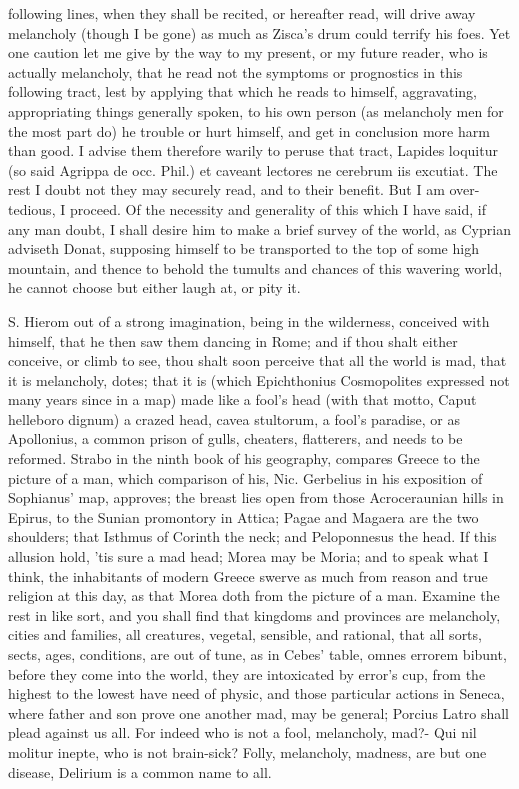 {following lines, when they shall be recited, or hereafter read, will
drive away melancholy (though I be gone) as much as Zisca's drum could
terrify his foes. Yet one caution let me give by the way to my present,
or my future reader, who is actually melancholy, that he read not the
symptoms or prognostics in this following tract, lest by applying
that which he reads to himself, aggravating, appropriating things
generally spoken, to his own person (as melancholy men for the most
part do) he trouble or hurt himself, and get in conclusion more harm
than good. I advise them therefore warily to peruse that tract, Lapides
loquitur (so said Agrippa de occ. Phil.) et caveant lectores ne
cerebrum iis excutiat. The rest I doubt not they may securely read, and
to their benefit. But I am over-tedious, I proceed.
Of the necessity and generality of this which I have said, if any man
doubt, I shall desire him to make a brief survey of the world, as 
Cyprian adviseth Donat, supposing himself to be transported to the top
of some high mountain, and thence to behold the tumults and chances of
this wavering world, he cannot choose but either laugh at, or pity it.

S. Hierom out of a strong imagination, being in the wilderness,
conceived with himself, that he then saw them dancing in Rome; and if
thou shalt either conceive, or climb to see, thou shalt soon perceive
that all the world is mad, that it is melancholy, dotes; that it is
(which Epichthonius Cosmopolites expressed not many years since in a
map) made like a fool's head (with that motto, Caput helleboro dignum)
a crazed head, cavea stultorum, a fool's paradise, or as Apollonius, a
common prison of gulls, cheaters, flatterers, \etc and needs to be
reformed. Strabo in the ninth book of his geography, compares Greece to
the picture of a man, which comparison of his, Nic. Gerbelius in his
exposition of Sophianus' map, approves; the breast lies open from those
Acroceraunian hills in Epirus, to the Sunian promontory in Attica;
Pagae and Magaera are the two shoulders; that Isthmus of Corinth the
neck; and Peloponnesus the head. If this allusion hold, 'tis sure a mad
head; Morea may be Moria; and to speak what I think, the inhabitants of
modern Greece swerve as much from reason and true religion at this day,
as that Morea doth from the picture of a man. Examine the rest in like
sort, and you shall find that kingdoms and provinces are melancholy,
cities and families, all creatures, vegetal, sensible, and rational,
that all sorts, sects, ages, conditions, are out of tune, as in Cebes'
table, omnes errorem bibunt, before they come into the world, they are
intoxicated by error's cup, from the highest to the lowest have need of
physic, and those particular actions in Seneca, where father and
son prove one another mad, may be general; Porcius Latro shall plead
against us all. For indeed who is not a fool, melancholy, mad?-
Qui nil molitur inepte, who is not brain-sick? Folly, melancholy,
madness, are but one disease, Delirium is a common name to all.

}
